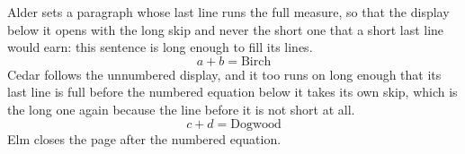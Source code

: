 \documentclass{article}
\begin{document}
Alder sets a paragraph whose last line runs the full measure, so that the
display below it opens with the long skip and never the short one that a
short last line would earn: this sentence is long enough to fill its lines.
\[ a + b = \text{Birch} \]
Cedar follows the unnumbered display, and it too runs on long enough that its
last line is full before the numbered equation below it takes its own skip,
which is the long one again because the line before it is not short at all.
\begin{equation} c + d = \text{Dogwood} \end{equation}
Elm closes the page after the numbered equation.
\end{document}
